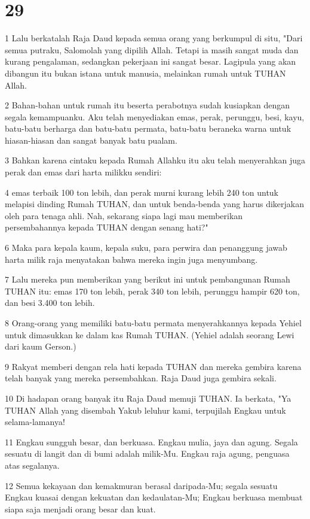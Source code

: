 \chapter{29}

\par 1 Lalu berkatalah Raja Daud kepada semua orang yang berkumpul di situ, "Dari semua putraku, Salomolah yang dipilih Allah. Tetapi ia masih sangat muda dan kurang pengalaman, sedangkan pekerjaan ini sangat besar. Lagipula yang akan dibangun itu bukan istana untuk manusia, melainkan rumah untuk TUHAN Allah.
\par 2 Bahan-bahan untuk rumah itu beserta perabotnya sudah kusiapkan dengan segala kemampuanku. Aku telah menyediakan emas, perak, perunggu, besi, kayu, batu-batu berharga dan batu-batu permata, batu-batu beraneka warna untuk hiasan-hiasan dan sangat banyak batu pualam.
\par 3 Bahkan karena cintaku kepada Rumah Allahku itu aku telah menyerahkan juga perak dan emas dari harta milikku sendiri:
\par 4 emas terbaik 100 ton lebih, dan perak murni kurang lebih 240 ton untuk melapisi dinding Rumah TUHAN, dan untuk benda-benda yang harus dikerjakan oleh para tenaga ahli. Nah, sekarang siapa lagi mau memberikan persembahannya kepada TUHAN dengan senang hati?"
\par 6 Maka para kepala kaum, kepala suku, para perwira dan penanggung jawab harta milik raja menyatakan bahwa mereka ingin juga menyumbang.
\par 7 Lalu mereka pun memberikan yang berikut ini untuk pembangunan Rumah TUHAN itu: emas 170 ton lebih, perak 340 ton lebih, perunggu hampir 620 ton, dan besi 3.400 ton lebih.
\par 8 Orang-orang yang memiliki batu-batu permata menyerahkannya kepada Yehiel untuk dimasukkan ke dalam kas Rumah TUHAN. (Yehiel adalah seorang Lewi dari kaum Gerson.)
\par 9 Rakyat memberi dengan rela hati kepada TUHAN dan mereka gembira karena telah banyak yang mereka persembahkan. Raja Daud juga gembira sekali.
\par 10 Di hadapan orang banyak itu Raja Daud memuji TUHAN. Ia berkata, "Ya TUHAN Allah yang disembah Yakub leluhur kami, terpujilah Engkau untuk selama-lamanya!
\par 11 Engkau sungguh besar, dan berkuasa. Engkau mulia, jaya dan agung. Segala sesuatu di langit dan di bumi adalah milik-Mu. Engkau raja agung, penguasa atas segalanya.
\par 12 Semua kekayaan dan kemakmuran berasal daripada-Mu; segala sesuatu Engkau kuasai dengan kekuatan dan kedaulatan-Mu; Engkau berkuasa membuat siapa saja menjadi orang besar dan kuat.
